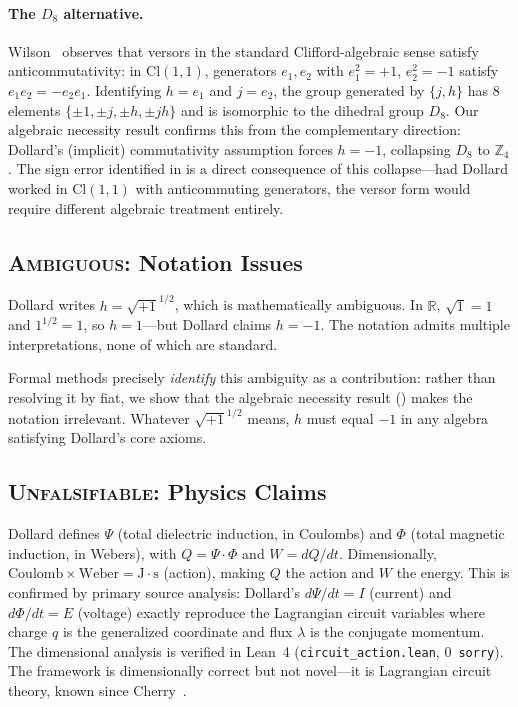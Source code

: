 \documentclass[runningheads]{llncs}
\begin{document}
\paragraph{The $D_8$ alternative.}
Wilson~\cite{wilson-private} observes that versors in the standard
Clifford-algebraic sense satisfy anticommutativity: in $\mathrm{Cl}(1,1)$,
generators $e_1, e_2$ with $e_1^2 = +1$, $e_2^2 = -1$ satisfy
$e_1 e_2 = -e_2 e_1$. Identifying $h = e_1$ and $j = e_2$, the group
generated by $\{j, h\}$ has 8 elements $\{\pm 1, \pm j, \pm h, \pm jh\}$
and is isomorphic to the dihedral group $D_8$.
Our algebraic necessity result confirms this from the complementary direction:
Dollard's (implicit) commutativity assumption forces $h = -1$, collapsing
$D_8$ to $\mathbb{Z}_4$. The sign error identified in 
is a direct consequence of this collapse---had Dollard worked in
$\mathrm{Cl}(1,1)$ with anticommuting generators, the versor form would
require different algebraic treatment entirely.

\subsection{\textsc{Ambiguous}: Notation Issues}

Dollard writes $h = \sqrt{+1}^{1/2}$, which is mathematically ambiguous.
In $\mathbb{R}$, $\sqrt{1} = 1$ and $1^{1/2} = 1$, so $h = 1$---but Dollard
claims $h = -1$. The notation admits multiple interpretations, none of which
are standard.

Formal methods precisely \emph{identify} this ambiguity as a contribution:
rather than resolving it by fiat, we show that the algebraic necessity result
() makes the notation irrelevant. Whatever
$\sqrt{+1}^{1/2}$ means, $h$ must equal $-1$ in any algebra satisfying
Dollard's core axioms.

\subsection{\textsc{Unfalsifiable}: Physics Claims}

Dollard defines $\Psi$ (total dielectric induction, in Coulombs) and $\Phi$
(total magnetic induction, in Webers), with $Q = \Psi \cdot \Phi$ and
$W = dQ/dt$. Dimensionally, $\text{Coulomb} \times \text{Weber} =
\text{J} \cdot \text{s}$ (action), making $Q$ the action and $W$ the energy.
This is confirmed by primary source analysis: Dollard's $d\Psi/dt = I$
(current) and $d\Phi/dt = E$ (voltage) exactly reproduce the Lagrangian
circuit variables where charge $q$ is the generalized coordinate and flux
$\lambda$ is the conjugate momentum. The dimensional
analysis is verified in Lean~4 (\texttt{circuit\_action.lean}, 0~\texttt{sorry}).
The framework is dimensionally correct but not novel---it is Lagrangian circuit
theory, known since Cherry~\cite{cherry1951}.
\end{document}
